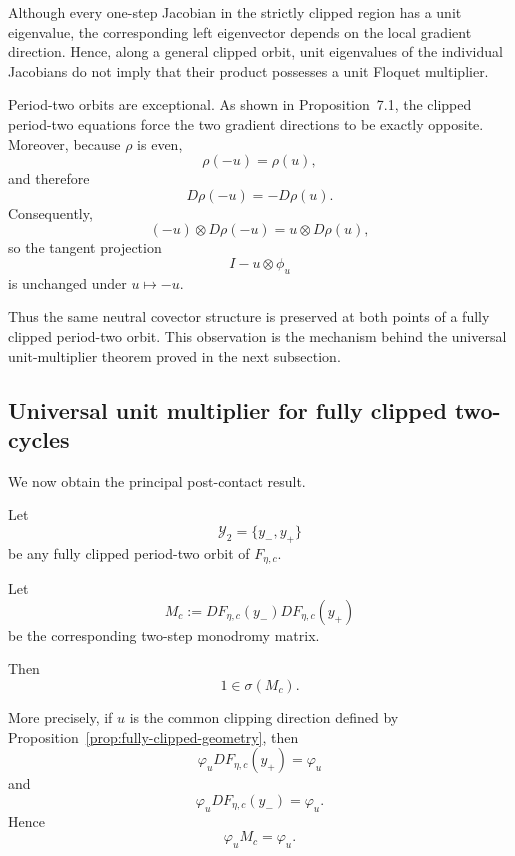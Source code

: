 \begin{remark}
\label{rem:pointwise-versus-orbit-neutrality}
Although every one-step Jacobian in the strictly clipped region
has a unit eigenvalue, the corresponding left eigenvector depends
on the local gradient direction. Hence, along a general clipped
orbit, unit eigenvalues of the individual Jacobians do not imply
that their product possesses a unit Floquet multiplier.

Period-two orbits are exceptional. As shown in
Proposition~7.1, the clipped period-two equations force the two
gradient directions to be exactly opposite. Moreover, because
$\rho$ is even,
\[
\rho(-u)=\rho(u),
\]
and therefore
\[
D\rho(-u)=-D\rho(u).
\]
Consequently,
\[
(-u)\otimes D\rho(-u)
=
u\otimes D\rho(u),
\]
so the tangent projection
\[
I-u\otimes\phi_u
\]
is unchanged under $u\mapsto -u$.

Thus the same neutral covector structure is preserved at both
points of a fully clipped period-two orbit. This observation is
the mechanism behind the universal unit-multiplier theorem proved
in the next subsection.
\end{remark}
                                                                                         


\subsection{Universal unit multiplier for fully clipped two-cycles}
\label{subsec:universal-unit-main}

We now obtain the principal post-contact result.

\begin{theorem}

\label{thm:universal-unit-main}
Let
\[
\mathcal Y_2
=
\{y_-,y_+\}
\]
be any fully clipped period-two orbit of $F_{\eta,c}$.

Let
\[
M_c
:=
DF_{\eta,c}(y_-)
DF_{\eta,c}(y_+)
\label{eq:main-monodromy}
\]
be the corresponding two-step monodromy matrix.

Then
\begin{equation}
\boxed{
1\in\sigma(M_c).
}
\label{eq:main-unit-multiplier}
\end{equation}

More precisely, if $u$ is the common clipping direction defined by
Proposition~\ref{prop:fully-clipped-geometry}, then
\begin{equation}
\varphi_u
DF_{\eta,c}(y_+)
=
\varphi_u
\label{eq:common-left-plus}
\end{equation}
and
\begin{equation}
\varphi_u
DF_{\eta,c}(y_-)
=
\varphi_u.
\label{eq:common-left-minus}
\end{equation}
Hence
\begin{equation}
\varphi_uM_c
=
\varphi_u.
\label{eq:common-left-monodromy}
\end{equation}
\end{theorem}


